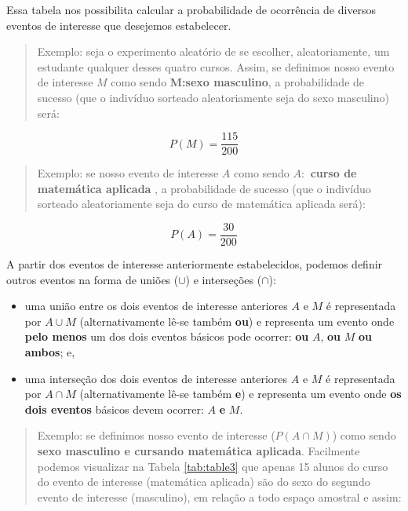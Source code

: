 \documentclass[
]{book}
\providecommand{\tightlist}{%
  \setlength{\itemsep}{0pt}\setlength{\parskip}{0pt}}
\begin{document}
\hfill\break

Essa tabela nos possibilita calcular a probabilidade de ocorrência de diversos eventos de interesse que desejemos estabelecer.

\hfill\break

\begin{quote}
Exemplo: seja o experimento aleatório de se escolher, aleatoriamente, um estudante qualquer desses quatro cursos. Assim, se definimos nosso evento de interesse \(M\) como sendo \textbf{M:sexo masculino}, a probabilidade de sucesso (que o indivíduo sorteado aleatoriamente seja do sexo masculino) será:
\end{quote}

\hfill\break

\[
P(M) = \frac{115}{200}
\]

\hfill\break

\begin{quote}
Exemplo: se nosso evento de interesse \(A\) como sendo \textbf{\(A:\) curso de matemática aplicada} , a probabilidade de sucesso (que o indivíduo sorteado aleatoriamente seja do curso de matemática aplicada será):
\end{quote}

\[
P(A) = \frac{30}{200}
\]

\hfill\break

A partir dos eventos de interesse anteriormente estabelecidos, podemos definir outros eventos na forma de uniões (\(\cup\)) e interseções (\(\cap\)):

\hfill\break

\begin{itemize}
\tightlist
\item
  uma união entre os dois eventos de interesse anteriores \(A\) e \(M\) é representada por \(A \cup M\) (alternativamente lê-se também \textbf{ou}) e representa um evento onde \textbf{pelo menos} um dos dois eventos básicos pode ocorrer: \textbf{ou} \(A\), \textbf{ou} \(M\) \textbf{ou ambos}; e,\\
\item
  uma interseção dos dois eventos de interesse anteriores \(A\) e \(M\) é representada por \(A \cap M\) (alternativamente lê-se também \textbf{e}) e representa um evento onde \textbf{os dois eventos} básicos devem ocorrer: \(A\) \textbf{e} \(M\).
\end{itemize}

\hfill\break

\begin{quote}
Exemplo: se definimos nosso evento de interesse (\(P(A \cap M)\)) como sendo \textbf{sexo masculino e cursando matemática aplicada}. Facilmente podemos visualizar na Tabela \ref{tab:table3} que apenas 15 alunos do curso do evento de interesse (matemática aplicada) são do sexo do segundo evento de interesse (masculino), em relação a todo espaço amostral e assim:
\end{quote}
\end{document}
